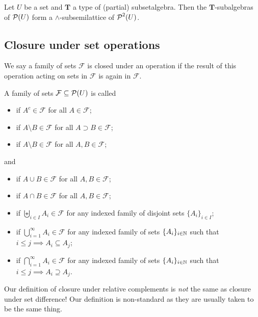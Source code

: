 \begin{proposition}
Let $U$ be a set and $\boldsymbol{T}$ a type of (partial) subsetalgebra. Then the $\boldsymbol{T}$-subalgebras of $\operatorname{\mathcal{P}}(U)$ form a $\wedge$-subsemilattice of $\operatorname{\mathcal{P}}^2(U)$.
\end{proposition}

\subsection{Closure under set operations}
We say a family of sets $\mathcal{F}$ is closed under an operation if the result of this operation acting on sets in $\mathcal{F}$ is again in $\mathcal{F}$.

\begin{definition}
A family of sets $\mathcal{F}\subseteq\operatorname{\mathcal{P}}(U)$ is called
\begin{itemize}
\item {} if $A^c\in\mathcal{F}$ for all $A\in\mathcal{F}$;
\item {} if $A\setminus B\in\mathcal{F}$ for all $A \supset B\in\mathcal{F}$;
\item {} if $A\setminus B\in\mathcal{F}$ for all $A, B\in\mathcal{F}$;
\end{itemize}
and
\begin{itemize}
\item {} if $A\cup B \in\mathcal{F}$ for all $A,B\in\mathcal{F}$;
\item {} if $A\cap B \in\mathcal{F}$ for all $A,B\in\mathcal{F}$;
\item {} if $\biguplus_{i\in I}A_i \in\mathcal{F}$ for any indexed family of disjoint sets $\{A_i\}_{i\in I}$;
\item {} if $\bigcup_{i=1}^\infty A_i \in\mathcal{F}$ for any indexed family of sets $\{A_i\}_{i\in \mathbb{N}}$ such that $i\leq j \implies A_i \subseteq A_j$;
\item {} if $\bigcap_{i=1}^\infty A_i \in\mathcal{F}$ for any indexed family of sets $\{A_i\}_{i\in \mathbb{N}}$ such that $i\leq j \implies A_i \supseteq A_j$.
\end{itemize}
Our definition of closure under relative complements is \emph{not} the same as closure under set difference! Our definition is non-standard as they are usually taken to be the same thing.
\end{definition}

